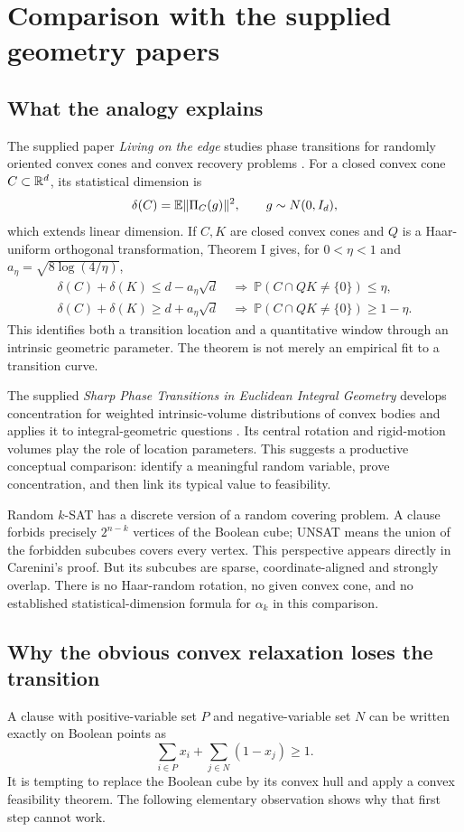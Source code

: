 \section{Comparison with the supplied geometry papers}
\label{sec:geometry}

\subsection{What the analogy explains}
The supplied paper \emph{Living on the edge} studies phase transitions for
randomly oriented convex cones and convex recovery problems \citep{almt2014}.
For a closed convex cone $C\subset\mathbb{R}^d$, its statistical dimension is
\[
 \delta(C)=\mathbb E\lVert\Pi_C(g)\rVert^2,
 \qquad g\sim N(0,I_d),
\]
which extends linear dimension. If $C,K$ are closed convex cones and $Q$ is
a Haar-uniform orthogonal transformation, Theorem I gives, for
$0<\eta<1$ and $a_\eta=\sqrt{8\log(4/\eta)}$,
\begin{align*}
 \delta(C)+\delta(K)\le d-a_\eta\sqrt d
 &\ \Longrightarrow\ \mathbb P(C\cap QK\ne\{0\})\le\eta,\\
 \delta(C)+\delta(K)\ge d+a_\eta\sqrt d
 &\ \Longrightarrow\ \mathbb P(C\cap QK\ne\{0\})\ge1-\eta.
\end{align*}
This identifies both a transition location and a quantitative window through
an intrinsic geometric parameter. The theorem is not merely an empirical
fit to a transition curve.

The supplied \emph{Sharp Phase Transitions in Euclidean Integral Geometry}
develops concentration for weighted intrinsic-volume distributions of convex
bodies and applies it to integral-geometric questions
\citep[Theorems I--II and Section 4]{lotz2026}. Its central rotation and
rigid-motion volumes play the role of location parameters. This suggests
a productive conceptual comparison: identify a meaningful random variable,
prove concentration, and then link its typical value to feasibility.

Random $k$-SAT has a discrete version of a random covering problem. A clause
forbids precisely $2^{n-k}$ vertices of the Boolean cube; UNSAT means the
union of the forbidden subcubes covers every vertex. This perspective appears
directly in Carenini's proof. But its subcubes are sparse, coordinate-aligned
and strongly overlap. There is no Haar-random rotation, no given convex cone,
and no established statistical-dimension formula for $\alpha_k$ in this
comparison.

\subsection{Why the obvious convex relaxation loses the transition}
A clause with positive-variable set $P$ and negative-variable set $N$ can
be written exactly on Boolean points as
\[
 \sum_{i\in P}x_i+\sum_{j\in N}(1-x_j)\ge1.
\]
It is tempting to replace the Boolean cube by its convex hull and apply a
convex feasibility theorem. The following elementary observation shows why
that first step cannot work.

